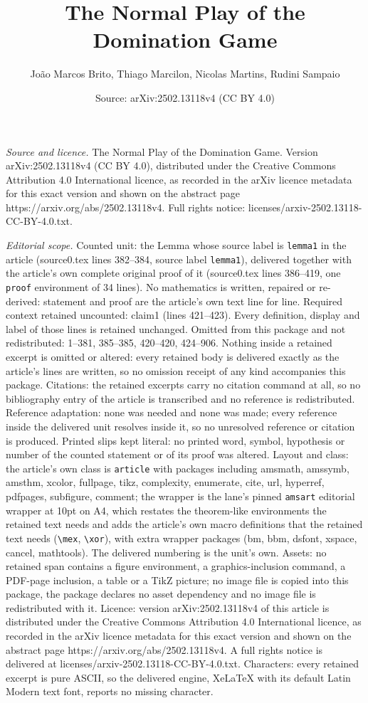\documentclass[10pt,a4paper]{amsart}
\title[The Normal Play of the Domination Game]{The Normal Play of the Domination Game}
\author{Jo\~ao Marcos Brito, Thiago Marcilon, Nicolas Martins, Rudini Sampaio}
\date{Source: arXiv:2502.13118v4 (CC BY 4.0)}
\begin{document}
\maketitle

\noindent\emph{Source and licence.} The Normal Play of the Domination Game. Version arXiv:2502.13118v4 (CC BY 4.0), distributed under the Creative Commons Attribution 4.0 International licence, as recorded in the arXiv licence metadata for this exact version and shown on the abstract page https://arxiv.org/abs/2502.13118v4. Full rights notice: licenses/arxiv-2502.13118-CC-BY-4.0.txt.\par\smallskip

\noindent\textit{Editorial scope.} Counted unit: the Lemma whose source label is \texttt{lemma1} in the article (source0.tex lines 382--384, source label \texttt{lemma1}), delivered together with the article's own complete original proof of it (source0.tex lines 386--419, one \texttt{proof} environment of 34 lines). No mathematics is written, repaired or re-derived: statement and proof are the article's own text line for line. Required context retained uncounted: claim1 (lines 421--423). Every definition, display and label of those lines is retained unchanged. Omitted from this package and not redistributed: 1--381, 385--385, 420--420, 424--906. Nothing inside a retained excerpt is omitted or altered: every retained body is delivered exactly as the article's lines are written, so no omission receipt of any kind accompanies this package. Citations: the retained excerpts carry no citation command at all, so no bibliography entry of the article is transcribed and no reference is redistributed. Reference adaptation: none was needed and none was made; every reference inside the delivered unit resolves inside it, so no unresolved reference or citation is produced. Printed slips kept literal: no printed word, symbol, hypothesis or number of the counted statement or of its proof was altered. Layout and class: the article's own class is \texttt{article} with packages including amsmath, amssymb, amsthm, xcolor, fullpage, tikz, complexity, enumerate, cite, url, hyperref, pdfpages, subfigure, comment; the wrapper is the lane's pinned \texttt{amsart} editorial wrapper at 10pt on A4, which restates the theorem-like environments the retained text needs and adds the article's own macro definitions that the retained text needs (\texttt{\textbackslash mex}, \texttt{\textbackslash xor}), with extra wrapper packages (bm, bbm, dsfont, xspace, cancel, mathtools). The delivered numbering is the unit's own. Assets: no retained span contains a figure environment, a graphics-inclusion command, a PDF-page inclusion, a table or a TikZ picture; no image file is copied into this package, the package declares no asset dependency and no image file is redistributed with it. Licence: version arXiv:2502.13118v4 of this article is distributed under the Creative Commons Attribution 4.0 International licence, as recorded in the arXiv licence metadata for this exact version and shown on the abstract page https://arxiv.org/abs/2502.13118v4. A full rights notice is delivered at licenses/arxiv-2502.13118-CC-BY-4.0.txt. Characters: every retained excerpt is pure ASCII, so the delivered engine, XeLaTeX with its default Latin Modern text font, reports no missing character.
\end{document}
